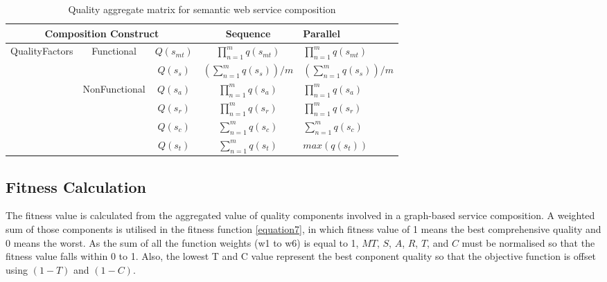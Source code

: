 \documentclass{llncs}
\begin{document}
\begin{table}[]
\centering
\caption{Quality aggregate matrix for semantic web service composition}
\label{table1}
\begin{tabular}{|c|c|c|c|l|}
\hline
\multicolumn{3}{|c|}{Composition Construct}                                      & Sequence                             & Parallel \\ \hline
\multirow{5}{*}{QualityFactors} & \multirow{2}{*}{Functional}    & $Q(s_ {mt})$  &$\prod_{n=1}^{m} q(s_ {mt})$          &  $\prod_{n=1}^{m} q(s_ {mt})$ \\ \cline{3-5}
                                &                                & $Q(s_ {s})$  & $(\sum_{n=1}^m q(s_ {s}))/m$        &  $(\sum_{n=1}^m q(s_ {s}))/m$  \\ \cline{2-5}   
                                & \multirow{4}{*}{NonFunctional} & $Q(s_{a})$    & $\prod_{n=1}^{m} q(s_a)$             &  $\prod_{n=1}^{m} q(s_a)$ \\ \cline{3-5} 
                                &                                & $Q(s_{r})$    & $\prod_{n=1}^{m} q(s_r)$             &  $\prod_{n=1}^{m} q(s_r)$ \\ \cline{3-5} 
                                &                                & $Q(s_{c})$    & $\sum_{n=1}^m q(s_ {c})$             &  $\sum_{n=1}^m q(s_ {c})$ \\ \cline{3-5} 
                                &                                & $Q(s_{t})$    & $\sum_{n=1}^m q(s_ {t})$             &  $max(q(s_ {t}))$ \\ \hline
\end{tabular}
\end{table}

\subsection{Fitness Calculation}
The fitness value is calculated from the aggregated value of quality components involved in a graph-based service composition. A weighted sum of those components is utilised in the fitness function \ref{equation7}, in which fitness value of 1 means the best comprehensive quality and 0 means the worst. As the sum of all the function weights (w1 to w6) is equal to 1, $MT$, $S$, $A$, $R$, $T$, and $C$ must be normalised so that the fitness value falls within 0 to 1. Also, the lowest T and C value represent the best conponent quality so that the objective function is offset using $(1 - T)$ and $(1 - C)$.
\end{document}
